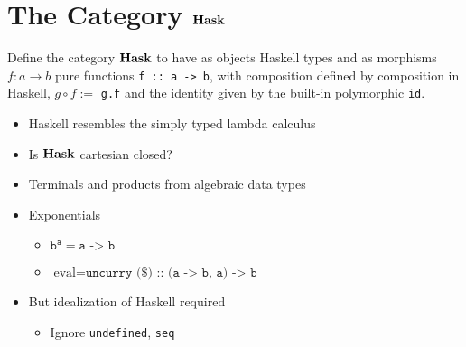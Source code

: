 \section{The Category $\mathbf{Hask}$}

\begin{frame}[fragile]
    \begin{definition}
        Define the category $\mathbf{Hask}$ to have as objects Haskell types and as
        morphisms $f: a \to b$ pure functions \verb|f :: a -> b|, with
        composition defined by composition in Haskell, $g \circ f :=$
        \verb|g.f| and the identity given by the built-in polymorphic \verb|id|.
    \end{definition}
\end{frame}

\begin{frame}[fragile]
    \begin{itemize}
        \item Haskell resembles the simply typed lambda calculus
        \item Is $\mathbf{Hask}$ cartesian closed?
        \item Terminals and products from algebraic data types
        \item Exponentials
        \begin{itemize}
            \item $\texttt{b}^\texttt{a} = \texttt{a -> b}$
            \item $\textrm{eval} = \texttt{uncurry (\$) :: (a -> b, a) -> b}$
        \end{itemize}
        \item But idealization of Haskell required
        \begin{itemize}
            \item Ignore \verb|undefined|, \verb|seq|
        \end{itemize}
    \end{itemize}
\end{frame}
